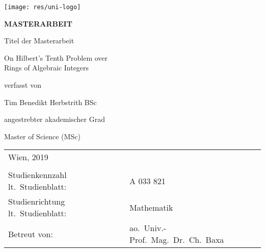 

\begin{titlepage}
\begin{flushright}
    \texttt{[image: res/uni-logo]}
\end{flushright}
\vspace{0.5cm}

\begin{center}  %
    \Huge{\textsf{\textbf{\MakeUppercase{
        Masterarbeit
    }}}}
    \vspace{1.5cm}

    \large{\textsf{  %
        Titel der Masterarbeit
    }}
    \vspace{.1cm}

    \LARGE{\textsf{ On Hilbert's Tenth Problem over\\
                    Rings of Algebraic Integers
    }}
    \vfill

    \large{\textsf{  %
        verfasst von
    }}

    \Large{\textsf{  Tim Benedikt Herbstrith BSc
    }}
    \vfill

    \large{\textsf{
        angestrebter akademischer Grad  %
    }}

    \Large{\textsf{  %
        Master of Science (MSc)
    }}

\vfill

\noindent\begin{tabular}{@{}ll}
\textsf{Wien, 2019}
&
\\
\\
\textsf{Studienkennzahl lt.\ Studienblatt:}
&
\textsf{A 033 821}  %
\\
\textsf{Studienrichtung lt.\ Studienblatt:}
&
\textsf{Mathematik}  %
\\
\textsf{Betreut von:}
&
\textsf{ao.~Univ.-Prof.~Mag.~Dr.~Ch.~Baxa}  %
\end{tabular}
\end{center}
\end{titlepage}

